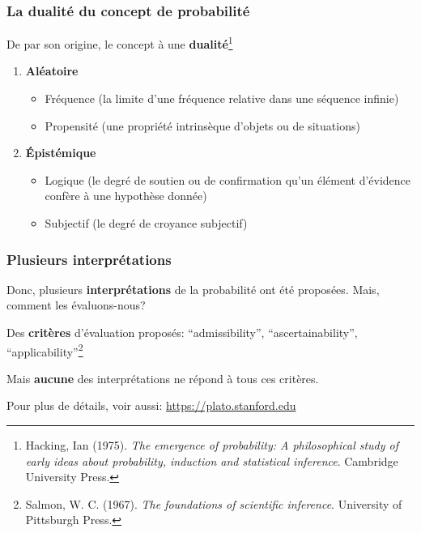 \documentclass{beamer}
\begin{document}
\begin{frame}
    \frametitle{La dualité du concept de probabilité}

    De par son origine, le concept à une \textbf{dualité}\footnote{
    Hacking, Ian (1975). \emph{The emergence of probability:
    A philosophical study of early ideas about probability,
    induction and statistical inference}. Cambridge University Press.
    }

    \pause

    \vfill

    \begin{enumerate}
      \item \textbf{Aléatoire}
        \begin{itemize}
          \item Fréquence (la limite d'une fréquence relative dans une séquence infinie)
          \item Propensité (une propriété intrinsèque d'objets ou de situations)
        \end{itemize}

      \pause

      \item \textbf{Épistémique}
        \begin{itemize}
          \item Logique (le degré de soutien ou de confirmation qu'un élément d'évidence confère à une hypothèse donnée)
          \item Subjectif (le degré de croyance subjectif)
        \end{itemize}
    \end{enumerate}    
\end{frame}


\begin{frame}
    \frametitle{Plusieurs interprétations}
    Donc, plusieurs \textbf{interprétations} de la probabilité ont été proposées. Mais, comment les évaluons-nous?
    
    \pause

    \vfill

    Des \textbf{critères} d’évaluation proposés: ``admissibility'', ``ascertainability'', ``applicability''\footnote{
    Salmon, W. C. (1967). \emph{The foundations of scientific inference}.
    University of Pittsburgh Press.
    }

    \pause

    \vfill

    Mais \textbf{aucune} des interprétations ne répond à tous ces critères.

    \pause

    \vfill

    Pour plus de détails, voir aussi:
    \href{https://plato.stanford.edu/entries/probability-interpret/}{https://plato.stanford.edu}
\end{frame}
\end{document}
